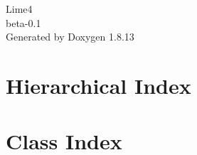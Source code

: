 \documentclass[twoside]{book}
\newcommand{\+}{\discretionary{\mbox{\scriptsize$\hookleftarrow$}}{}{}}
\newcommand{\clearemptydoublepage}{%
  \newpage{\pagestyle{empty}\cleardoublepage}%
}
\begin{document}
\hypersetup{pageanchor=false,
             bookmarksnumbered=true,
             pdfencoding=unicode
            }
\begin{titlepage}
\vspace*{7cm}
\begin{center}%
{\Large Lime4 \\[1ex]\large beta-\/0.\+1 }\\
\vspace*{1cm}
{\large Generated by Doxygen 1.8.13}\\
\end{center}
\end{titlepage}
\clearemptydoublepage
{}
\tableofcontents
\clearemptydoublepage
{}
\hypersetup{pageanchor=true}

\chapter{Hierarchical Index}

\chapter{Class Index}

\end{document}

